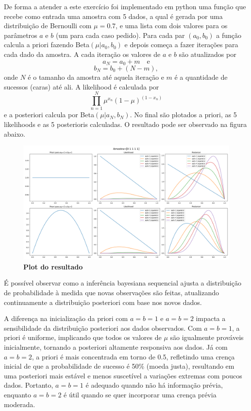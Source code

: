 \begin{enumerate}[label=E\arabic*]
De forma a atender a este exercício foi implementado em python uma função que recebe como entrada uma amostra com 5 dados, a qual é gerada por uma distribuição de Bernoulli com $\mu=0.7$, e uma lista com dois valores para os parâmetros $a$ e $b$ (um para cada caso pedido). Para cada par $(a_0,b_0)$ a função calcula a priori fazendo Beta$(\mu|a_0,b_0)$ e depois começa a fazer iterações para cada dado da amostra. A cada iteração os valores de $a$ e $b$ são atualizados por 
\begin{equation*}
    a_N = a_0 + m \quad \text{e}
\end{equation*}
\begin{equation*}
    b_N = b_0 + (N - m),
\end{equation*}
onde $N$ é o tamanho da amostra até aquela iteração e $m$ é a quantidade de sucessos (caras) até ali. A likelihood é calculada por 
\begin{equation*}
    \prod_{n=1}^{N}\mu^{x_n}(1-\mu)^{(1-x_n)}
\end{equation*}
e a posteriori calcula por Beta$(\mu|a_N,b_N)$. No final são plotados a priori, as 5 likelihoods e as 5 posterioris calculadas. O resultado pode ser observado na figura abaixo.

\begin{figure}[H]
    \caption{\textbf{Plot do resultado}}
       \centering
       \includegraphics[width=\textwidth]{ex1.png}
\end{figure}

É possível observar como a inferência bayesiana sequencial ajusta a distribuição de probabilidade à medida que novas observações são feitas, atualizando continuamente a distribuição posteriori com base nos novos dados.

A diferença na inicialização da priori com $a = b = 1$ e $a = b = 2$ impacta a sensibilidade da distribuição posteriori aos dados observados. Com $a = b = 1$, a priori é uniforme, implicando que todos os valores de $\mu$ são igualmente prováveis inicialmente, tornando a posteriori altamente responsiva aos dados. Já com $a = b = 2$, a priori é mais concentrada em torno de 0.5, refletindo uma crença inicial de que a probabilidade de sucesso é 50\% (moeda justa), resultando em uma posteriori mais estável e menos suscetível a variações extremas com poucos dados. Portanto, $a = b = 1$ é adequado quando não há informação prévia, enquanto $a = b = 2$ é útil quando se quer incorporar uma crença prévia moderada.
\newpage


\end{enumerate}
